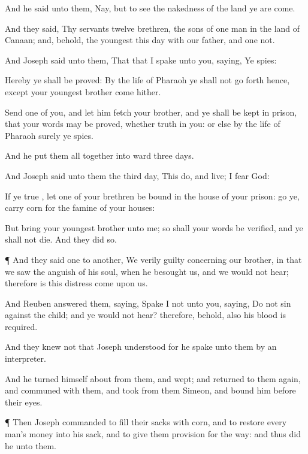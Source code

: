 {And he
said unto them, Nay, but to
see the
nakedness of the
land ye are
come.

And they
said, Thy
servants
{}
twelve
brethren, the
sons of
one
man in the
land of
Canaan; and, behold, the
youngest
{} this
day with our
father, and
one
{} not.

And
Joseph
said unto them, That
{} that I
spake unto you,
saying, Ye
{}
spies:

Hereby ye shall be
proved: By the
life of
Pharaoh ye shall not go
forth hence, except your
youngest
brother
come hither.

Send
one of you, and let him
fetch your
brother, and ye shall be kept in
prison, that your
words may be
proved, whether
{}
truth
in you: or
else by the
life of
Pharaoh surely ye
{}
spies.

And he put them all
together into
ward
three
days.

And
Joseph
said unto them the
third
day, This
do, and
live;
{} I
fear
God:

If ye
{}
true
{}, let
one of your
brethren be
bound in the
house of your
prison:
go ye,
carry
corn for the
famine of your
houses:

But
bring your
youngest
brother unto me; so shall your
words be
verified, and ye shall not
die. And they
did so.


\par }{\PP {}¶ And they
said
one to
another, We
{}
verily
guilty concerning our
brother, in
that we
saw the
anguish of his
soul, when he
besought us, and we would not
hear; therefore is this
distress
come upon us.

And
Reuben
answered them,
saying, Spake
I not unto you,
saying, Do not
sin against the
child; and ye would not
hear? therefore, behold, also his
blood is
required.

And they
knew not that
Joseph
understood
{} for he spake unto them by an
interpreter.

And he turned himself
about from them, and
wept; and returned to them
again, and
communed with them, and
took from them
Simeon, and
bound him before their
eyes.


\par }{\PP {}¶ Then
Joseph
commanded to
fill their
sacks with
corn, and to
restore every
man’s
money into his
sack, and to
give them
provision for the
way: and
thus did
he unto them.

}
